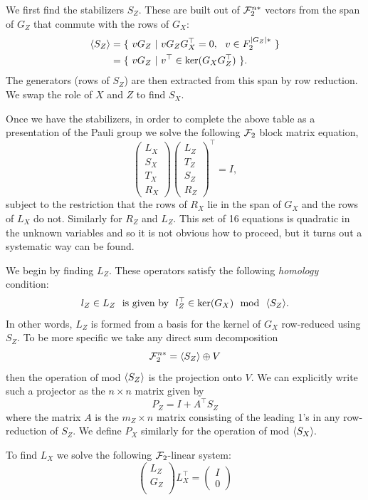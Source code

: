 We first find the stabilizers $S_Z$.
These are built out of $\mathcal{F}_2^{n*}$ vectors from the span of $G_Z$
that commute with the rows of $G_X:$
\begin{align*}
    \Span{S_Z} &= \{\  vG_Z \ |\  v G_Z G_X^\top = 0, \ \ v \in F_2^{|G_Z|*}\ \} \\
               &= \{\  vG_Z \ |\  v^\top \in \Ker(G_X G_Z^\top)  \ \}.
\end{align*}
The generators (rows of $S_Z$) are then extracted
from this span by row reduction.
We swap the role of $X$ and $Z$ to find $S_X.$

Once we have the stabilizers, in order to
complete the above table as a presentation
of the Pauli group we solve the
following $\mathcal{F}_2$ block matrix equation,
$$
\left( \begin{array}{l}
L_X\\
S_X\\
T_X\\
R_X
\end{array} \right)
\left( \begin{array}{l}
L_Z\\
T_Z\\
S_Z\\
R_Z
\end{array} \right)^\top =
I,
$$
subject to the restriction that the rows of
$R_X$ lie in the span of $G_X$ and
the rows of $L_X$ do not.
Similarly for $R_Z$ and $L_Z.$
This set of 16 equations is quadratic in the unknown variables
and so it is not obvious how to proceed, but it turns out a
systematic way can be found.

We begin by finding $L_Z.$
These operators satisfy the following \emph{homology} condition:
$$
    l_Z \in L_Z \ \ \mbox{is given by}\ \  l_Z^\top \in \mathrm{ker}(G_X) \ \ \mbox{mod}\ \  \langle S_Z \rangle.
$$
In other words, $L_Z$ is formed from a basis for the kernel of $G_X$ 
row-reduced using $S_Z.$
To be more specific %
we take any direct sum decomposition
$$\mathcal{F}_2^{n*} = \langle S_Z \rangle \oplus V$$
then the operation of mod $\langle S_Z \rangle$ is the
projection onto $V.$
We can explicitly write such a 
projector as the $n\times n$
matrix given by
$$
    P_Z = I + A^\top S_Z
$$
where the matrix $A$ is the $m_Z\times n$ matrix consisting of
the leading 1's in any row-reduction of $S_Z.$
We define $P_X$ similarly for the operation of mod $\langle S_X \rangle.$

To find $L_X$ we solve the following $\mathcal{F}_2$-linear
system:
$$
\left( \begin{array}{l}
L_Z\\
G_Z\\
\end{array} \right)
L_X^\top = 
\left( \begin{array}{l}
I\\
0
\end{array} \right)
$$

